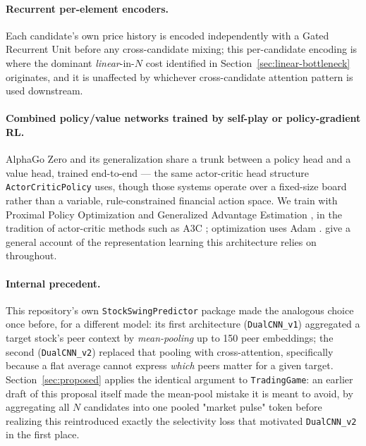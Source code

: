 \documentclass[11pt]{article}
\newcommand{\code}[1]{\texttt{#1}}
\begin{document}
\paragraph{Recurrent per-element encoders.} Each candidate's own price
history is encoded independently with a Gated Recurrent Unit
\citep{cho2014gru} before any cross-candidate mixing; this per-candidate
encoding is where the dominant \emph{linear}-in-$N$ cost identified in
Section~\ref{sec:linear-bottleneck} originates, and it is unaffected by
whichever cross-candidate attention pattern is used downstream.

\paragraph{Combined policy/value networks trained by self-play or
policy-gradient RL.} AlphaGo Zero and its generalization
\citep{silver2017agz,silver2018alphazero} share a trunk between a policy head
and a value head, trained end-to-end --- the same actor-critic head
structure \texttt{ActorCriticPolicy} uses, though those systems operate over
a fixed-size board rather than a variable, rule-constrained financial action
space. We train with Proximal Policy Optimization
\citep{schulman2017ppo} and Generalized Advantage Estimation
\citep{schulman2016gae}, in the tradition of actor-critic methods such as
A3C \citep{mnih2016a3c}; optimization uses Adam \citep{kingma2015adam}.
\citet{lecun2015deeplearning} give a general account of the representation
learning this architecture relies on throughout.

\paragraph{Internal precedent.} This repository's own
\texttt{StockSwingPredictor} package made the analogous choice once before,
for a different model: its first architecture (\code{DualCNN\_v1}) aggregated
a target stock's peer context by \emph{mean-pooling} up to 150 peer
embeddings; the second (\code{DualCNN\_v2}) replaced that pooling with
cross-attention, specifically because a flat average cannot express
\emph{which} peers matter for a given target. Section~\ref{sec:proposed}
applies the identical argument to \texttt{TradingGame}: an earlier draft of
this proposal itself made the mean-pool mistake it is meant to avoid, by
aggregating all $N$ candidates into one pooled "market pulse" token before
realizing this reintroduced exactly the selectivity loss that motivated
\code{DualCNN\_v2} in the first place.
\end{document}

